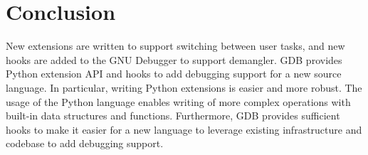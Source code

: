 \chapter{Conclusion}
New extensions are written to support switching between \uCCS user tasks, and
new hooks are added to the GNU
Debugger to support \CFAS demangler. GDB provides Python extension API and hooks to add debugging support for a
new source language. In particular, writing Python extensions is easier and more
robust. The usage of the Python language enables writing of
more complex operations with built-in data structures and functions.
Furthermore, GDB provides sufficient hooks to make it easier for a new language to leverage existing
infrastructure and codebase to add debugging support.
